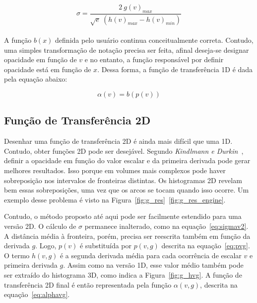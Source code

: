 \begin{equation} \label{eq:sigmav2}
	\sigma = \frac{2\ g(v)_{max}}{\sqrt{e}\ (h(v)_{max} - h(v)_{min})}
\end{equation} \\

	A função $b(x)$ definida pelo usuário continua conceitualmente correta. Contudo, uma simples transformação de notação precisa ser feita, afinal deseja-se designar opacidade em função de $v$ e no entanto, a função responsável por definir opacidade está em função de $x$. Dessa forma, a função de transferência 1D é dada pela equação abaixo:
	
\begin{equation} \label{eq:alpha}
	\alpha(v) = b(p(v))
\end{equation}

    
\subsection{Função de Transferência 2D}
\label{gordon.2d}
    Desenhar uma função de transferência 2D é ainda mais difícil que uma 1D. Contudo, obter funções 2D pode ser desejável. Segundo \textit{Kindlmann e Durkin}~\cite{gordon}, definir a opacidade em função do valor escalar e da primeira derivada pode gerar melhores resultados. Isso porque em volumes mais complexos pode haver sobreposição nos intervalos de fronteiras distintas. Os histogramas 2D revelam bem essas sobreposições, uma vez que os arcos se tocam quando isso ocorre. Um exemplo desse problema é visto na Figura~\ref{fig:g_res}~\ref{fig:g_res_engine}.
    
    Contudo, o método proposto até aqui pode ser facilmente estendido para uma versão 2D. O cálculo de $\sigma$ permanece inalterado, como na equação~\eqref{eq:sigmav2}. A distância média à fronteira, porém, precisa ser reescrita também em função da derivada $g$. Logo, $p(v)$ é substituída por $p(v,g)$ descrita na equação~\eqref{eq:pvg}. O termo $h(v,g)$ é a segunda derivada média para cada ocorrência de escalar $v$ e primeira derivada $g$. Assim como na versão 1D, esse valor médio também pode ser extraído do histograma 3D, como indica a Figura~\ref{fig:g_hvg}. A função de transferência 2D final é então representada pela função $ \alpha(v, g) $, descrita na equação~\eqref{eq:alphavg}.
    
